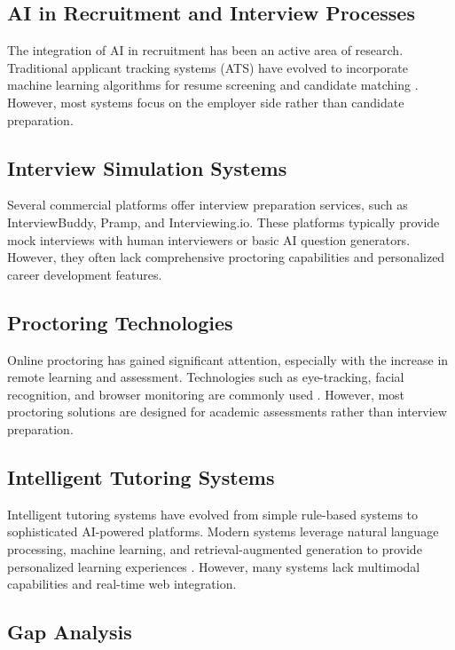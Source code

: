 \documentclass[12pt, conference]{IEEEtran}
\begin{document}
\subsection{AI in Recruitment and Interview Processes}

The integration of AI in recruitment has been an active area of research. Traditional applicant tracking systems (ATS) have evolved to incorporate machine learning algorithms for resume screening and candidate matching \cite{smith2023ai}. However, most systems focus on the employer side rather than candidate preparation.

\subsection{Interview Simulation Systems}

Several commercial platforms offer interview preparation services, such as InterviewBuddy, Pramp, and Interviewing.io. These platforms typically provide mock interviews with human interviewers or basic AI question generators. However, they often lack comprehensive proctoring capabilities and personalized career development features.

\subsection{Proctoring Technologies}

Online proctoring has gained significant attention, especially with the increase in remote learning and assessment. Technologies such as eye-tracking, facial recognition, and browser monitoring are commonly used \cite{brown2022online}. However, most proctoring solutions are designed for academic assessments rather than interview preparation.

\subsection{Intelligent Tutoring Systems}

Intelligent tutoring systems have evolved from simple rule-based systems to sophisticated AI-powered platforms. Modern systems leverage natural language processing, machine learning, and retrieval-augmented generation to provide personalized learning experiences \cite{wilson2023advances}. However, many systems lack multimodal capabilities and real-time web integration.

\subsection{Gap Analysis}
\end{document}
